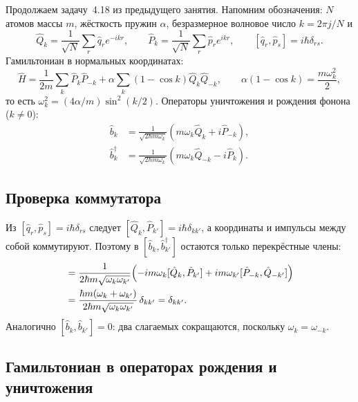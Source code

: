 \documentclass[../final.tex]{subfiles}
\begin{document}


Продолжаем задачу~4.18 из предыдущего занятия. Напомним обозначения:
$N$ атомов массы $m$, жёсткость пружин $\alpha$, безразмерное волновое
число $k=2\pi j/N$ и
\[
    \hat Q_k=\frac1{\sqrt N}\sum_r\hat q_re^{-ikr},\qquad
    \hat P_k=\frac1{\sqrt N}\sum_r\hat p_re^{ikr},\qquad
    [\hat q_r,\hat p_s]=i\hbar\delta_{rs}.
\]
Гамильтониан в нормальных координатах:
\[
    \hat H=\frac1{2m}\sum_k\hat P_k\hat P_{-k}
       +\alpha\sum_k(1-\cos k)\hat Q_k\hat Q_{-k},
    \qquad
    \alpha(1-\cos k)=\frac{m\omega_k^2}{2},
\]
то есть $\omega_k^2=(4\alpha/m)\sin^2(k/2)$.
Операторы уничтожения и рождения фонона ($k\ne0$):
\begin{align*}
    \hat b_k&=\frac1{\sqrt{2\hbar m\omega_k}}
       \left(m\omega_k\hat Q_k+i\hat P_{-k}\right),\\
    \hat b_k^\dagger&=\frac1{\sqrt{2\hbar m\omega_k}}
       \left(m\omega_k\hat Q_{-k}-i\hat P_k\right).
\end{align*}

\subsection*{Проверка коммутатора}

Из $[\hat q_r,\hat p_s]=i\hbar\delta_{rs}$ следует
$[\hat Q_k,\hat P_{k'}]=i\hbar\delta_{kk'}$, а координаты и импульсы
между собой коммутируют. Поэтому в $[\hat b_k,\hat b_{k'}^\dagger]$
остаются только перекрёстные члены:
\begin{align*}
    [\hat b_k,\hat b_{k'}^\dagger]
       &=\frac1{2\hbar m\sqrt{\omega_k\omega_{k'}}}
         \Bigl(-im\omega_k[\hat Q_k,\hat P_{k'}]
               +im\omega_{k'}[\hat P_{-k},\hat Q_{-k'}]\Bigr)\\
       &=\frac{\hbar m(\omega_k+\omega_{k'})}
              {2\hbar m\sqrt{\omega_k\omega_{k'}}}\,\delta_{kk'}
        =\delta_{kk'}.
\end{align*}
Аналогично $[\hat b_k,\hat b_{k'}]=0$: два слагаемых сокращаются,
поскольку $\omega_k=\omega_{-k}$.

\subsection*{Гамильтониан в операторах рождения и уничтожения}
\end{document}
